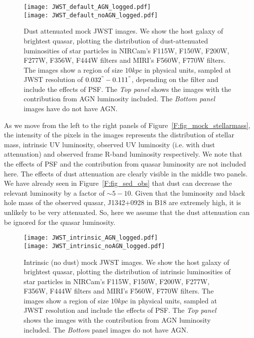 \documentclass[twocolumn,useAMS,usenatbib]{mnras} \usepackage{natbib}
\begin{document}
\begin{figure*}
\vbox{
\texttt{[image: JWST\_default\_AGN\_logged.pdf]} \\
\texttt{[image: JWST\_default\_noAGN\_logged.pdf]}}
\caption{\label{F:fig_mock_dust} Dust attenuated mock JWST images. We show the host galaxy of brightest quasar, plotting the distribution of dust-attenuated luminosities of star particles in NIRCam's F115W, F150W, F200W, F277W, F356W, F444W filters and MIRI's F560W, F770W filters. The images show a region of size $10 kpc$ in physical units, sampled at JWST resolution of $0.032^{"} - 0.111^{"}$, depending on the filter and include the effects of PSF. The {\em Top panel} shows the images with the contribution from AGN luminosity included. The {\em Bottom panel} images have do not have AGN.}
\end{figure*}


As we move from the left to the right panels of Figure~\ref{F:fig_mock_stellarmass}, the intensity of the pixels in the images represents the distribution of stellar mass, intrinsic UV luminosity, observed UV luminosity (i.e. with dust attenuation) and observed frame R-band luminosity respectively.
 We note that the effects of PSF and the contribution from quasar luminosity are not included here. The effects of dust attenuation are clearly visible in the middle two panels. We have already seen 
 in Figure~\ref{F:fig_sed_obs} that dust can decrease the relevant
 luminosity by a factor of $\sim 5-10$. Given that the luminosity and black hole mass of the observed quasar, J1342$+$0928 in B18 are extremely high, it is unlikely to be very attenuated. So, here we assume that the dust attenuation can be ignored for the quasar luminosity. 

\begin{figure*}
\vbox{
\texttt{[image: JWST\_intrinsic\_AGN\_logged.pdf]} \\
\texttt{[image: JWST\_intrinsic\_noAGN\_logged.pdf]}}

\caption{\label{F:fig_mock_intrinsic} Intrinsic (no dust) mock JWST images. We show  the host galaxy of brightest quasar, plotting the distribution of intrinsic luminosities of star particles in NIRCam's F115W, F150W, F200W, F277W, F356W, F444W filters and MIRI's F560W, F770W filters. The images show a region of size $10 kpc$ in physical units, sampled at JWST resolution and include the effects of PSF. The {\em Top panel} shows the images with the contribution from AGN luminosity included. The {\em Bottom} panel images do not have AGN.
}
\end{figure*}
\end{document}
